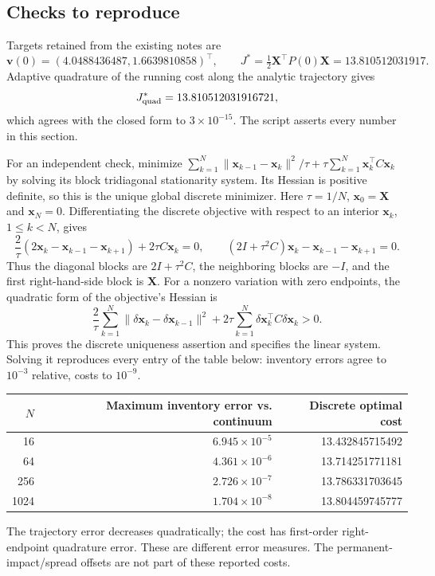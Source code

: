 \subsection*{Checks to reproduce}

Targets retained from the existing notes are
\[
 \mathbf v(0)=(4.0488436487,1.6639810858)^\top,\qquad
 J^*=\tfrac12\mathbf X^\top P(0)\mathbf X=13.810512031917.
\]
Adaptive quadrature of the running cost along the analytic trajectory gives
\[
 J^*_{\rm quad}=13.810512031916721,
\]
which agrees with the closed form to $3\times10^{-15}$. The script 
asserts every number in this section.

For an independent check, minimize
$\sum_{k=1}^N\|\mathbf x_{k-1}-\mathbf x_k\|^2/\tau
+\tau\sum_{k=1}^N\mathbf x_k^\top C\mathbf x_k$ by solving its block
tridiagonal stationarity system. Its Hessian is positive definite, so this
is the unique global discrete minimizer.
Here $\tau=1/N$, $\mathbf x_0=\mathbf X$ and $\mathbf x_N=0$.
Differentiating the discrete objective with respect to an interior
$\mathbf x_k$, $1\le k<N$, gives
\[
 \frac{2}{\tau}(2\mathbf x_k-\mathbf x_{k-1}-\mathbf x_{k+1})
 +2\tau C\mathbf x_k=0,
 \qquad
 (2I+\tau^2 C)\mathbf x_k-\mathbf x_{k-1}-\mathbf x_{k+1}=0.
\]
Thus the diagonal blocks are $2I+\tau^2 C$, the neighboring blocks
are $-I$, and the first right-hand-side block is $\mathbf X$.
For a nonzero variation with zero endpoints, the quadratic form of the
objective's Hessian is
\[
 \frac{2}{\tau}\sum_{k=1}^N
 \|\delta\mathbf x_k-\delta\mathbf x_{k-1}\|^2
 +2\tau\sum_{k=1}^N\delta\mathbf x_k^\top C\delta\mathbf x_k>0.
\]
This proves the discrete uniqueness assertion and specifies the
linear system. Solving it reproduces every entry of the table below:
inventory errors agree to $10^{-3}$ relative, costs to $10^{-9}$.
\begin{center}
\begin{tabular}{@{}rrr@{}}
\toprule
$N$ & Maximum inventory error vs. continuum & Discrete optimal cost \\
\midrule
16 & $6.945\times10^{-5}$ & 13.432845715492 \\
64 & $4.361\times10^{-6}$ & 13.714251771181 \\
256 & $2.726\times10^{-7}$ & 13.786331703645 \\
1024 & $1.704\times10^{-8}$ & 13.804459745777 \\
\bottomrule
\end{tabular}
\end{center}
The trajectory error decreases quadratically; the cost has first-order
right-endpoint quadrature error. These are different error measures.
The permanent-impact/spread offsets are not part of these reported costs.

